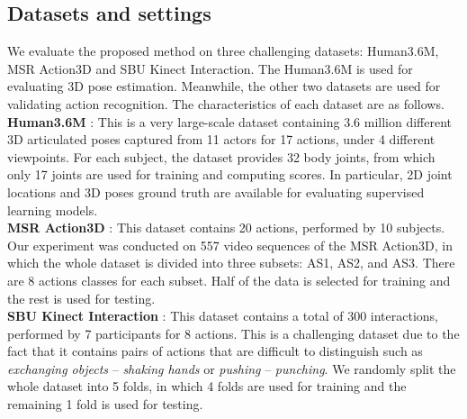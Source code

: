 \documentclass{bmvc2k}
\begin{document}
\subsection{Datasets and settings \\[-0.1cm]}
We evaluate the proposed method on three challenging datasets: Human3.6M, MSR Action3D and SBU Kinect Interaction. The Human3.6M is used for evaluating 3D pose estimation. Meanwhile, the other two datasets are used for validating action recognition. The characteristics of each dataset are as follows.\\[0.15cm]
\textbf{Human3.6M} \cite{6682899}: This is a very large-scale dataset containing 3.6 million different 3D articulated poses captured from 11 actors for 17 actions, under 4 different viewpoints. For each subject, the dataset provides 32 body joints, from which only 17 joints are used for training and computing scores. In particular, 2D joint locations and 3D poses ground truth are available for evaluating supervised learning models.\\[0.15cm]
\textbf{MSR Action3D} \cite{li2010action}: This dataset contains 20 actions, performed by 10 subjects. Our experiment was conducted on 557 video sequences of the MSR Action3D, in which the whole dataset is  divided into three subsets: AS1, AS2, and AS3. There are 8 actions classes for each subset. Half of the data is selected for training and the rest is used for testing.\\[0.15cm]
\textbf{SBU Kinect Interaction} \cite{yun2012two}: This dataset contains a total of 300 interactions, performed by 7 participants for 8 actions. This is a challenging dataset due to the fact that it contains pairs of actions that are difficult to distinguish such as \textit{exchanging objects} -- \textit{shaking hands} or \textit{pushing} -- \textit{punching}. We randomly split the whole dataset into 5 folds, in which 4 folds are used for training and the remaining 1 fold is used for testing.\\[-0.7cm]
\end{document}
